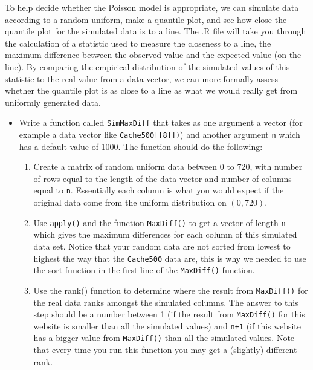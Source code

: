 \documentclass[11pt]{article}
\begin{document}
To help decide whether the Poisson model is appropriate, we can simulate data according 
to a random uniform, make a quantile plot, and see how close the quantile plot for the simulated data is to a line. 
The .R file will take you through the calculation of a 
statistic used to measure the closeness to a line, the maximum difference between the
observed value and the expected value (on the line).  By comparing the empirical
distribution of the simulated values of this statistic to the real value from a data
vector, we can more formally assess whether the quantile plot is as close to a line
as what we would really get from uniformly generated data. \\

\begin{itemize}

\item[6)] Write a function called {\tt SimMaxDiff} that takes as one argument a vector 
(for example a data vector like {\tt Cache500[[8]])}) and another argument {\tt n} which has a default value of 1000.  The function should do the following:
\begin{enumerate}
\item Create a matrix of random uniform data between 0 to 720, 
with number of rows equal to the length of the data vector and number of columns equal to {\tt n}.
Essentially each column is what you would expect if the original data come from the uniform distribution on $(0, 720)$. 

\item Use {\tt apply()} and the function {\tt MaxDiff()} to get a vector of length {\tt n} which gives the maximum differences for each column of this simulated data set.  Notice that your random data are not sorted from lowest to highest the way that the {\tt Cache500} data are, this is why we needed to use the sort function in the first line of the {\tt MaxDiff()} function.

\item Use the rank() function to determine where the result from {\tt MaxDiff()} for the real data ranks amongst the simulated columns.  The answer to this step should be a number between 1 (if the result from {\tt MaxDiff()} for this website is smaller than all the simulated values) and {\tt n+1} (if this website has a bigger value from {\tt MaxDiff()} than all the simulated values.  Note that every time you run this function you may get a (slightly) different rank.


\end{enumerate}
\end{itemize}
\end{document}
